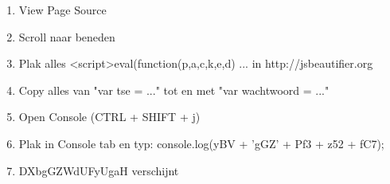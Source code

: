 \begin{enumerate}
  \item View Page Source
  \item Scroll naar beneden
  \item Plak alles \textless script\textgreater eval(function(p,a,c,k,e,d) ... in http://jsbeautifier.org
  \item Copy alles van "var tse = ..." tot en met "var wachtwoord = ..."
  \item Open Console (CTRL + SHIFT + j)
  \item Plak in Console tab en typ: console.log(yBV + 'gGZ' + Pf3 + z52 + fC7);
  \item DXbgGZWdUFyUgaH verschijnt
\end{enumerate}